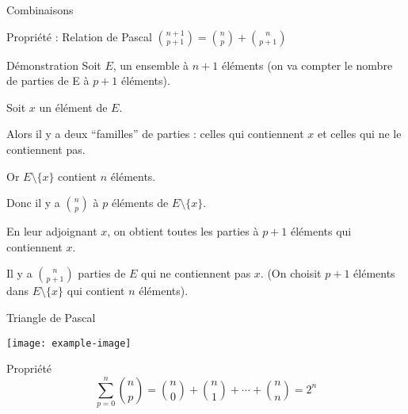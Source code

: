 \documentclass{cours}
\begin{document}
\begin{Gpartie}{Combinaisons}
        \begin{Spartie}{Propriété : Relation de Pascal}
            $\binom{n+1}{p+1}=\binom{n}{p}+\binom{n}{p+1}$
            \begin{SSpartie}{Démonstration}
                Soit $E$, un ensemble à $n+1$ éléments (on va compter le nombre de parties de E à $p+1$ éléments). \par
                Soit $x$ un élément de $E$. \par
                Alors il y a deux ``familles'' de parties : celles qui contiennent $x$ et celles qui ne le contiennent pas. \par
                Or $E\setminus\{x\}$ contient $n$ éléments. \par
                Donc il y a $\binom{n}{p}$ à $p$ éléments de $E\setminus\{x\}$. \par
                En leur adjoignant $x$, on obtient toutes les parties à $p+1$ éléments qui contiennent $x$. \par
                Il y a $\binom{n}{p+1}$ parties de $E$ qui ne contiennent pas $x$. (On choisit $p+1$ éléments dans $E\setminus\{x\}$ qui contient $n$ éléments).
            \end{SSpartie}
        \end{Spartie}
        \begin{Spartie}{Triangle de Pascal}
            \begin{center}
                    \texttt{[image: example-image]}
                    \parbox{\linewidth}{}
            \end{center}
        \end{Spartie}
        \begin{Spartie}{Propriété}
            \[\sum_{p=0}^{n}\binom{n}{p}=\binom{n}{0}+\binom{n}{1}+\cdots+\binom{n}{n}=2^n\]
        \end{Spartie}
    \end{Gpartie}
\end{document}
